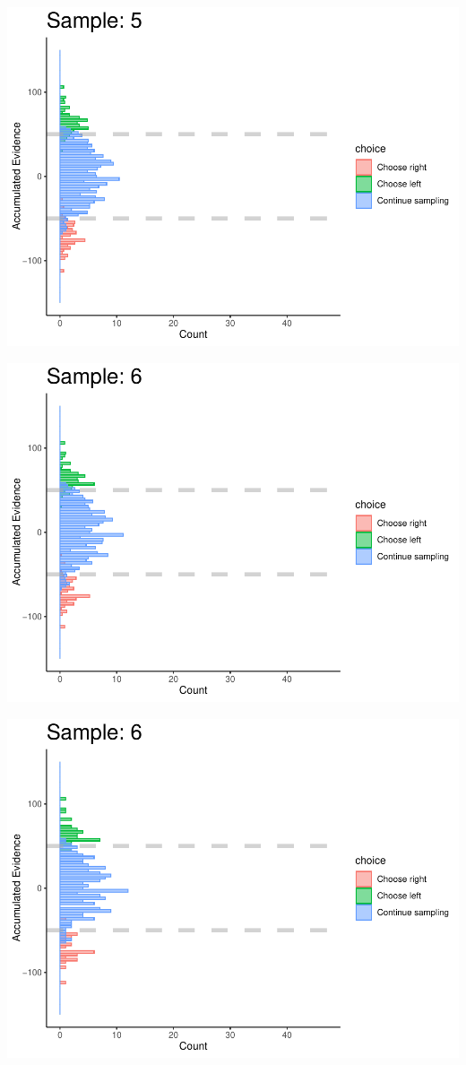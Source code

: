 \documentclass[
]{book}
\begin{document}
\begin{center}\includegraphics[width=0.8\linewidth]{LateNightBayes_files/figure-latex/fixed_check-49} \end{center}

\begin{center}\includegraphics[width=0.8\linewidth]{LateNightBayes_files/figure-latex/fixed_check-50} \end{center}

\begin{center}\includegraphics[width=0.8\linewidth]{LateNightBayes_files/figure-latex/fixed_check-51} \end{center}
\end{document}
